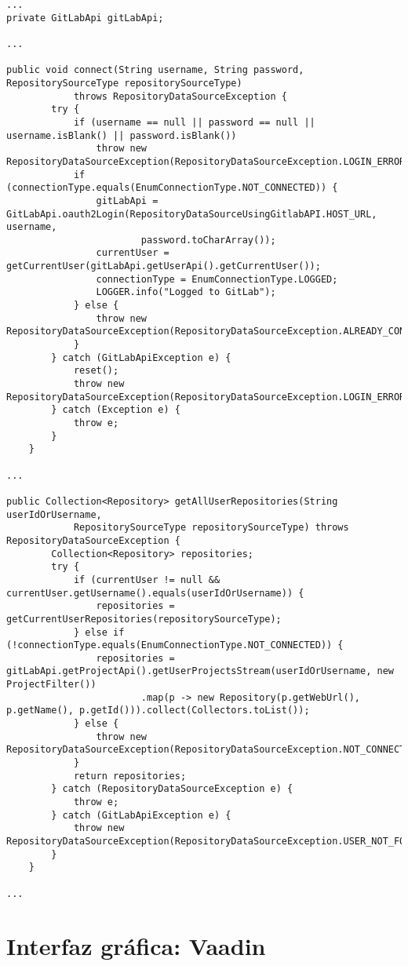 \begin{minipage}{\linewidth}
{\tiny
\begin{verbatim}
...
private GitLabApi gitLabApi;

...

public void connect(String username, String password, RepositorySourceType repositorySourceType)
			throws RepositoryDataSourceException {
		try {
			if (username == null || password == null || username.isBlank() || password.isBlank())
				throw new RepositoryDataSourceException(RepositoryDataSourceException.LOGIN_ERROR);
			if (connectionType.equals(EnumConnectionType.NOT_CONNECTED)) {
				gitLabApi = GitLabApi.oauth2Login(RepositoryDataSourceUsingGitlabAPI.HOST_URL, username,
						password.toCharArray());
				currentUser = getCurrentUser(gitLabApi.getUserApi().getCurrentUser());
				connectionType = EnumConnectionType.LOGGED;
				LOGGER.info("Logged to GitLab");
			} else {
				throw new RepositoryDataSourceException(RepositoryDataSourceException.ALREADY_CONNECTED);
			}
		} catch (GitLabApiException e) {
			reset();
			throw new RepositoryDataSourceException(RepositoryDataSourceException.LOGIN_ERROR);
		} catch (Exception e) {
			throw e;
		}
	}

...

public Collection<Repository> getAllUserRepositories(String userIdOrUsername,
			RepositorySourceType repositorySourceType) throws RepositoryDataSourceException {
		Collection<Repository> repositories;
		try {
			if (currentUser != null && currentUser.getUsername().equals(userIdOrUsername)) {
				repositories = getCurrentUserRepositories(repositorySourceType);
			} else if (!connectionType.equals(EnumConnectionType.NOT_CONNECTED)) {
				repositories = gitLabApi.getProjectApi().getUserProjectsStream(userIdOrUsername, new ProjectFilter())
						.map(p -> new Repository(p.getWebUrl(), p.getName(), p.getId())).collect(Collectors.toList());
			} else {
				throw new RepositoryDataSourceException(RepositoryDataSourceException.NOT_CONNECTED);
			}
			return repositories;
		} catch (RepositoryDataSourceException e) {
			throw e;
		} catch (GitLabApiException e) {
			throw new RepositoryDataSourceException(RepositoryDataSourceException.USER_NOT_FOUND);
		}
	}
	
...
\end{verbatim}
}
\end{minipage}

\section{Interfaz gráfica: Vaadin}

